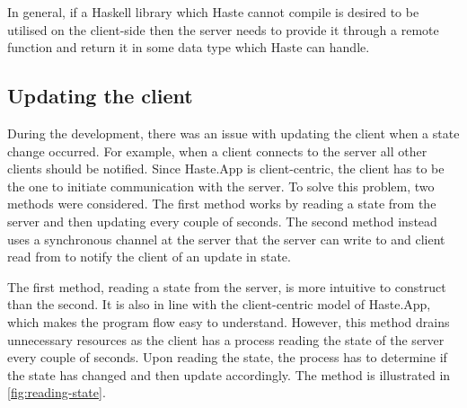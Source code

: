 \documentclass[a4paper]{article}
\begin{document}
In general, if a Haskell library which Haste cannot compile is desired to be utilised on the client-side then the server needs to provide it through a remote function and return it in some data type which Haste can handle.

\subsection{Updating the client}
\label{sub:updating-client}
During the development, there was an issue with updating the client when a state change occurred. For example, when a client connects to the server all other clients should be notified. Since Haste.App is client-centric, the client has to be the one to initiate communication with the server. To solve this problem, two methods were considered. The first method works by reading a state from the server and then updating every couple of seconds. The second method instead uses a synchronous channel at the server that the server can write to and client read from to notify the client of an update in state.


The first method, reading a state from the server, is more intuitive to construct than the second. It is also in line with the client-centric model of Haste.App, which makes the program flow easy to understand. However, this method drains unnecessary resources as the client has a process reading the state of the server every couple of seconds. Upon reading the state, the process has to determine if the state has changed and then update accordingly. The method is illustrated in \cref{fig:reading-state}.
\end{document}
